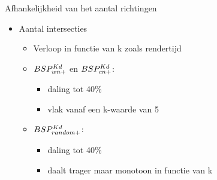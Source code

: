 \documentclass[11pt,t]{beamer}
\begin{document}
\begin{frame}{Afhankelijkheid van het aantal richtingen}
	\begin{itemize}
		\item Aantal intersecties
		\begin{itemize}
			\item Verloop in functie van k zoals rendertijd
			\item $BSP^{Kd}_{wn+}$ en $BSP^{Kd}_{cn+}$:
				\begin{itemize}
					\item daling tot 40\%
					\item vlak vanaf een k-waarde van 5
				\end{itemize}
			\item $BSP^{Kd}_{random+}$:
				\begin{itemize}
					\item daling tot 40\%
					\item daalt trager maar monotoon in functie van k
				\end{itemize}
		\end{itemize}
	\end{itemize}
\end{frame}
\end{document}
